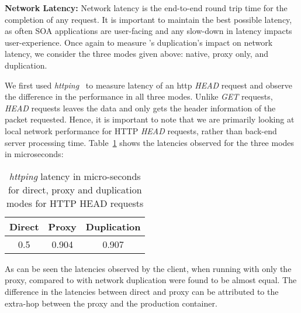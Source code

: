 \noindent \textbf{Network Latency:}
Network latency is the end-to-end round trip time for the completion of any request. 
It is important to maintain the best possible latency, as often SOA applications are user-facing and any slow-down in latency impacts user-experience. 
Once again to measure \parikshan's duplication's impact on network latency, we consider the three modes given above: native, proxy only, and duplication.

We first used \emph{httping}~\cite{httping} to measure latency of an http \emph{HEAD} request and observe the difference in the performance in all three modes. 
Unlike \emph{GET} requests, \emph{HEAD} requests leaves the data and only gets the header information of the packet requested. 
Hence, it is important to note that we are primarily looking at local network performance for HTTP \emph{HEAD} requests, rather than back-end server processing time.
Table~\ref{tab:httping} shows the latencies observed for the three modes in microseconds:\\

\begin{table}[ht]
	\centering
	\setlength{\tabcolsep}{4pt}
	\begin{center}
		\begin{tabular}{c c c}
			\toprule
			\textbf{Direct} & \textbf{Proxy} & \textbf{Duplication} \\
  			\midrule
  			0.5& 0.904& 0.907 \\
  			\bottomrule
		\end{tabular}
	\end{center}
\caption{ \emph{httping} latency in micro-seconds for direct, proxy and duplication modes for HTTP HEAD requests}
\label{tab:httping}
\end{table}
  
As can be seen the latencies observed by the client, when running with only the proxy, compared to with network duplication were found to be almost equal. 
The difference in the latencies between direct and proxy can be attributed to the extra-hop between the proxy and the production container. \\


